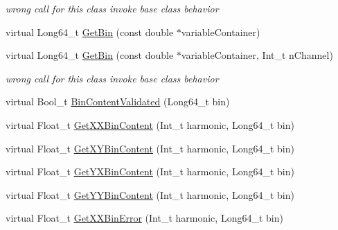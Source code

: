 \begin{DoxyCompactItemize}
\begin{DoxyCompactList}\small\item\em wrong call for this class invoke base class behavior \end{DoxyCompactList}\item 
virtual Long64\+\_\+t \mbox{\hyperlink{classQn_1_1CorrectionProfileCorrelationComponentsHarmonics_a51113d377e95ddd78f89adb9c2cd52df}{Get\+Bin}} (const double $\ast$variable\+Container)
\item 
\mbox{\label{classQn_1_1CorrectionProfileCorrelationComponentsHarmonics_af500f2c1e6751686dfb060c268e9cef5}} 
virtual Long64\+\_\+t \mbox{\hyperlink{classQn_1_1CorrectionProfileCorrelationComponentsHarmonics_af500f2c1e6751686dfb060c268e9cef5}{Get\+Bin}} (const double $\ast$variable\+Container, Int\+\_\+t n\+Channel)
\begin{DoxyCompactList}\small\item\em wrong call for this class invoke base class behavior \end{DoxyCompactList}\item 
virtual Bool\+\_\+t \mbox{\hyperlink{classQn_1_1CorrectionProfileCorrelationComponentsHarmonics_aed95bd8eea2e060ba3040d25f3533177}{Bin\+Content\+Validated}} (Long64\+\_\+t bin)
\item 
virtual Float\+\_\+t \mbox{\hyperlink{classQn_1_1CorrectionProfileCorrelationComponentsHarmonics_aa48fa859f512dcd7b7e0a7c7ede4bb99}{Get\+X\+X\+Bin\+Content}} (Int\+\_\+t harmonic, Long64\+\_\+t bin)
\item 
virtual Float\+\_\+t \mbox{\hyperlink{classQn_1_1CorrectionProfileCorrelationComponentsHarmonics_af7d5feb2bafb19417950f6d16cdfceb0}{Get\+X\+Y\+Bin\+Content}} (Int\+\_\+t harmonic, Long64\+\_\+t bin)
\item 
virtual Float\+\_\+t \mbox{\hyperlink{classQn_1_1CorrectionProfileCorrelationComponentsHarmonics_a14b776082f56bec058ef29e6ae69fed1}{Get\+Y\+X\+Bin\+Content}} (Int\+\_\+t harmonic, Long64\+\_\+t bin)
\item 
virtual Float\+\_\+t \mbox{\hyperlink{classQn_1_1CorrectionProfileCorrelationComponentsHarmonics_a0256be6f18beb3a2562891e2912b55fb}{Get\+Y\+Y\+Bin\+Content}} (Int\+\_\+t harmonic, Long64\+\_\+t bin)
\item 
virtual Float\+\_\+t \mbox{\hyperlink{classQn_1_1CorrectionProfileCorrelationComponentsHarmonics_a412fe35fd2adf2a73a6ddfdad4a3f880}{Get\+X\+X\+Bin\+Error}} (Int\+\_\+t harmonic, Long64\+\_\+t bin)

\end{DoxyCompactItemize}
